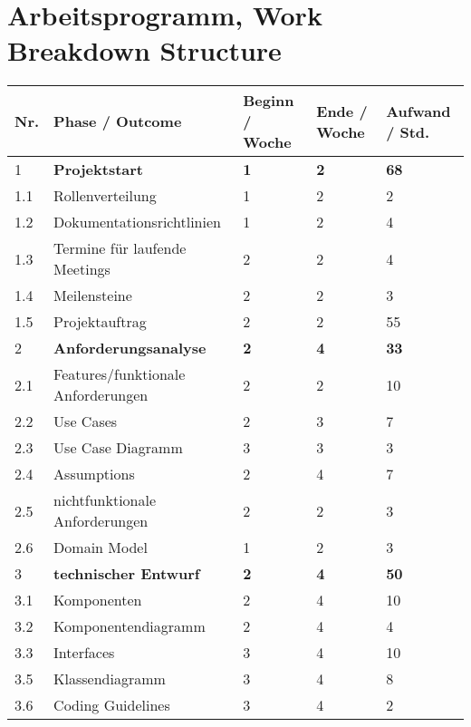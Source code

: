 
\section{Arbeitsprogramm, Work Breakdown Structure}

\begin{tabular}{ | l | p{8cm} | p{2cm}|p{2cm}|p{2cm}|}
\hline
\textbf{Nr.} & \textbf{Phase / Outcome} & \textbf{Beginn / Woche}& \textbf{Ende / Woche}& \textbf{Aufwand / Std.} \\
\hline
1 & \textbf{Projektstart}                      & \textbf{1} & \textbf{2} & \textbf{68} \\
\hline
1.1& Rollenverteilung                  &1 &2 &2 \\
\hline
1.2 &Dokumentationsrichtlinien         &1 &2 &4 \\
\hline
1.3 &Termine für laufende Meetings     &2 &2 &4 \\
\hline
1.4 &Meilensteine                      &2 &2 &3 \\
\hline
1.5 &Projektauftrag                    &2 &2 &55 \\
\hline
2&\textbf{Anforderungsanalyse}               &\textbf{2} &\textbf{4}&\textbf{33}  \\
\hline
2.1 &Features/funktionale Anforderungen&2 &2 &10 \\
\hline
2.2 &Use Cases                         &2 &3 &7  \\
\hline
2.3 &Use Case Diagramm                 &3 &3 & 3 \\
\hline
2.4 &Assumptions                       &2 &4 & 7 \\
\hline
2.5 &nichtfunktionale Anforderungen    &2 &2 & 3 \\
\hline
2.6 &Domain Model                      &1 &2 & 3 \\
\hline
3&\textbf{technischer Entwurf}              &\textbf{2} &\textbf{4} & \textbf{50}  \\
\hline
3.1 &Komponenten                       &2 &4 & 10 \\
\hline
3.2 &Komponentendiagramm               &2 &4 & 4 \\
\hline
3.3 &Interfaces                        &3 &4 & 10 \\
\hline
3.5 &Klassendiagramm                   &3 &4 & 8 \\
\hline
3.6 &Coding Guidelines                 &3 &4 & 2 \\

\end{tabular}
